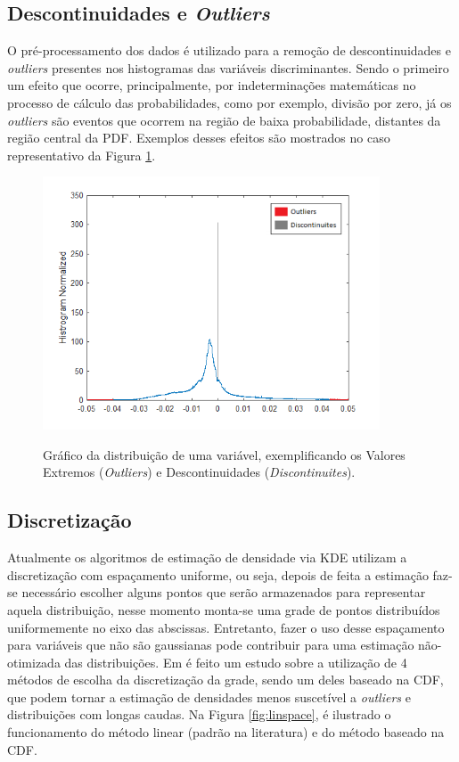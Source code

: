 \clearpage

\subsection{Descontinuidades e \textit{Outliers}}

O pré-processamento dos dados é utilizado para a remoção de descontinuidades e \textit{outliers} presentes nos histogramas das variáveis discriminantes. Sendo o primeiro um efeito que ocorre, principalmente, por indeterminações matemáticas no processo de cálculo das probabilidades, como por exemplo, divisão por zero, já os \textit{outliers} são eventos que ocorrem na região de baixa probabilidade, distantes da região central da PDF. Exemplos desses efeitos são mostrados no caso representativo da Figura \ref{fig:5T06}.

  \begin{figure}[h]
	\centering
	\includegraphics[width=10cm]{./textuais/algoritmo/figuras/explicacaooutilers.png}\\
	\caption{Gráfico da distribuição de uma variável, exemplificando os Valores Extremos (\emph{Outliers}) e Descontinuidades (\emph{Discontinuites}).}
	\label{fig:5T06}
\end{figure}


\subsection{Discretização}

Atualmente os algoritmos de estimação de densidade via KDE utilizam a discretização com espaçamento uniforme, ou seja, depois de feita a estimação faz-se necessário escolher alguns pontos que serão armazenados para representar aquela distribuição, nesse momento monta-se uma grade de pontos distribuídos uniformemente no eixo das abscissas. Entretanto, fazer o uso desse espaçamento para variáveis que não são gaussianas pode contribuir para uma estimação não-otimizada das distribuições. Em \cite{costa2017study} é feito um estudo sobre a utilização de 4 métodos de escolha da discretização da grade, sendo um deles baseado na \ac{CDF}, que podem tornar a estimação de densidades menos suscetível a \textit{outliers} e distribuições com longas caudas. Na Figura \ref{fig:linspace}, é ilustrado o funcionamento do método linear (padrão na literatura) e do método baseado na \ac{CDF}.

